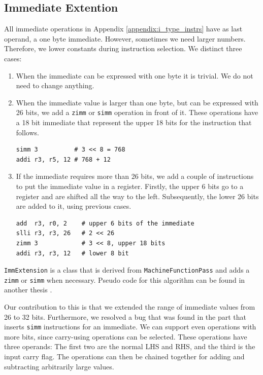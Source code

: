 \subsection{Immediate Extention}\label{sec:immediate_ext}
All immediate operations in Appendix \ref{appendix:i_type_instrs} have as last operand, a one byte immediate. However, sometimes we need larger numbers. Therefore, we lower constants during instruction selection. We distinct three cases:
\begin{enumerate}
\item When the immediate can be expressed with one byte it is trivial. We do not need to change anything.
\item When the immediate value is larger than one byte, but can be expressed with 26 bits, we add a \texttt{zimm} or \texttt{simm} operation in front of it. These operations have a 18 bit immediate that represent the upper 18 bits for the instruction that follows.

\begin{lstlisting}
simm 3          # 3 << 8 = 768
addi r3, r5, 12 # 768 + 12
\end{lstlisting}
\item If the immediate requires more than 26 bits, we add a couple of instructions to put the immediate value in a register. Firstly, the upper 6 bits go to a register and are shifted all the way to the left. Subsequently, the lower 26 bits are added to it, using previous cases.
\begin{lstlisting}
add  r3, r0, 2    # upper 6 bits of the immediate
slli r3, r3, 26   # 2 << 26
zimm 3            # 3 << 8, upper 18 bits
addi r3, r3, 12   # lower 8 bit
\end{lstlisting}
\end{enumerate}

\texttt{ImmExtension} is a class that is derived from \texttt{MachineFunctionPass} and adds a \texttt{zimm} or \texttt{simm} when necessary. Pseudo code for this algorithm can be found in another thesis \cite[Appendix B]{liu_zhenyuan}. 

Our contribution to this is that we extended the range of immediate values from 26 to 32 bits. Furthermore, we resolved a bug that was found in the part that inserts \texttt{simm} instructions for an immediate. We can support even operations with more bits, since carry-using operations can be selected. These operations have three operands: The first two are the normal LHS and RHS, and the third is the input carry flag. The operations can then be chained together for adding and subtracting arbitrarily large values.

